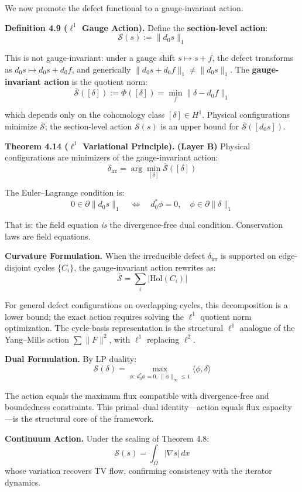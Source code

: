 \documentclass[
]{article}
\begin{document}
We now promote the defect functional to a gauge-invariant action.

\textbf{Definition 4.9 (\(\ell^1\) Gauge Action).} Define the
\textbf{section-level action}: \[ \mathcal{S}(s) := \|d_0 s\|_1 \]

This is not gauge-invariant: under a gauge shift \(s \mapsto s + f\),
the defect transforms as \(d_0 s \mapsto d_0 s + d_0 f\), and
generically \(\|d_0 s + d_0 f\|_1 \neq \|d_0 s\|_1\). The
\textbf{gauge-invariant action} is the quotient norm:
\[ \bar{\mathcal{S}}([\delta]) := \Phi([\delta]) = \min_f \|\delta - d_0 f\|_1 \]

which depends only on the cohomology class \([\delta] \in H^1\).
Physical configurations minimize \(\bar{\mathcal{S}}\); the
section-level action \(\mathcal{S}(s)\) is an upper bound for
\(\bar{\mathcal{S}}([d_0 s])\).

\textbf{Theorem 4.14 (\(\ell^1\) Variational Principle).} \textbf{(Layer
B)} Physical configurations are minimizers of the gauge-invariant
action:
\[ \delta_{\mathrm{irr}} = \arg\min_{[\delta]} \bar{\mathcal{S}}([\delta]) \]

The Euler--Lagrange condition is:
\[ 0 \in \partial \|d_0 s\|_1 \quad \Longleftrightarrow \quad d_0^* \phi = 0, \quad \phi \in \partial \|\delta\|_1 \]

That is: the field equation \emph{is} the divergence-free dual
condition. Conservation laws are field equations.

\textbf{Curvature Formulation.} When the irreducible defect
\(\delta_{\mathrm{irr}}\) is supported on edge-disjoint cycles
\(\{C_i\}\), the gauge-invariant action rewrites as:
\[ \bar{\mathcal{S}} = \sum_i |\mathrm{Hol}(C_i)| \]

For general defect configurations on overlapping cycles, this
decomposition is a lower bound; the exact action requires solving the
\(\ell^1\) quotient norm optimization. The cycle-basis representation is
the structural \(\ell^1\) analogue of the Yang--Mills action
\(\sum \|F\|^2\), with \(\ell^1\) replacing \(\ell^2\).

\textbf{Dual Formulation.} By LP duality:
\[ \mathcal{S}(\delta) = \max_{\phi:\, d_0^* \phi = 0,\, \|\phi\|_\infty \le 1} \langle \phi, \delta \rangle \]

The action equals the maximum flux compatible with divergence-free and
boundedness constraints. This primal--dual identity---action equals flux
capacity---is the structural core of the framework.

\textbf{Continuum Action.} Under the scaling of Theorem 4.8:
\[ \mathcal{S}(s) = \int_\Omega |\nabla s| \, dx \] whose variation
recovers TV flow, confirming consistency with the iterator dynamics.
\end{document}
